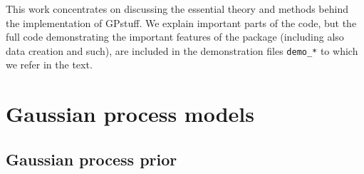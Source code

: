 \documentclass[twoside,11pt]{article}
\newcommand{\pkg}[1]{{\fontseries{b}\selectfont #1}}
\newcommand{\code}[1]{{\normalfont\texttt{#1}}}
\begin{document}


This work concentrates on discussing the essential theory and methods
behind the implementation of \pkg{GPstuff}. We explain important parts
of the code, but the full code demonstrating the important features of
the package (including also data creation and such), are included in
the demonstration files \code{demo\_*} to which we refer in the text.

\section{Gaussian process models}

\subsection{Gaussian process prior}
\end{document}
